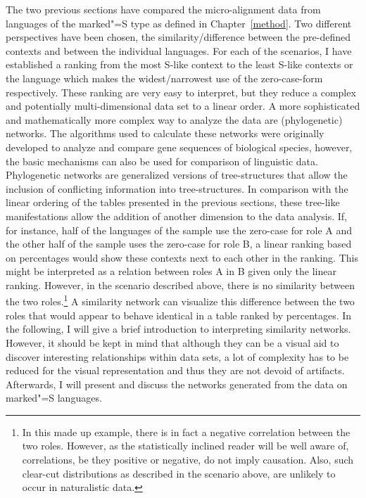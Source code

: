 The two previous sections have compared the micro-alignment data from languages of the marked"=S type as defined in Chapter~\ref{method}.
Two different perspectives have been chosen, the similarity/difference between the pre-defined contexts and between the individual languages. 
For each of the scenarios, I have established a ranking from the most S-like context to the least S-like contexts or the language which makes the widest/narrowest use of the zero-case-form respectively.
These ranking are very easy to interpret, but they reduce a complex and potentially multi-dimensional data set to a linear order.
A more sophisticated and mathematically more complex way to analyze the data are (phylogenetic) networks.
The algorithms used to calculate these networks were originally developed to analyze and compare gene sequences of biological species, however, the basic mechanisms can also be used for comparison of linguistic data. 
Phylogenetic networks are generalized versions of tree-structures that allow the inclusion of conflicting information into tree-structures.
In comparison with the linear ordering of the tables presented in the previous sections, these tree-like manifestations allow the addition of another dimension to the data analysis.
If, for instance, half of the languages of the sample use the zero-case for role A and the other half of the sample uses the zero-case for role B, a linear ranking based on percentages would show these contexts next to each other in the ranking. 
This might be interpreted as a relation between roles A in B given only the linear ranking. 
However, in the scenario described above, there is no similarity between the two roles.\footnote{In this made up example, there is in fact a negative correlation between the two roles. However, as the statistically inclined reader will be well aware of, correlations, be they positive or negative, do not imply causation. 
Also, such clear-cut distributions as described in the scenario above, are unlikely to occur in naturalistic data.} 
A similarity network can visualize this difference between the two roles that would appear to behave identical in a table ranked by percentages.
In the following, I will give a brief introduction to interpreting similarity networks. 
However, it should be kept in mind that although they can be a visual aid to discover interesting relationships within data sets, a lot of complexity has to be reduced for the visual representation and thus they are not devoid of artifacts.  
Afterwards, I will present and discuss the networks generated from the data on marked"=S languages. 
